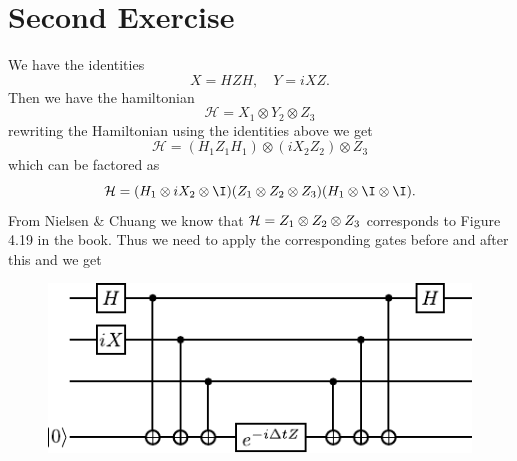 \section{Second Exercise}
We have the identities
\begin{equation}
    X = HZH, \quad Y = iXZ.
\end{equation}
Then we have the hamiltonian 
\begin{equation}
    \mathcal{H} = X_1 \otimes Y_2 \otimes Z_3
\end{equation}
rewriting the Hamiltonian using the identities above we get
\begin{equation}
    \mathcal{H} = (H_1 Z_1 H_1) \otimes (i X_2 Z_2) \otimes Z_3
\end{equation}
which can be factored as
\begin{equation}
    \mathcal{H} =  (H_1 \otimes iX_2 \otimes \I) ( Z_1 \ot Z_2 \ot Z_3) (H_1 \ot \I \ot \I).
\end{equation}
From Nielsen \& Chuang we know that $\mathcal{H} = Z_1 \otimes Z_2 \otimes Z_3$ corresponds to Figure 4.19 in the book. Thus we need to apply the corresponding gates before and after this and we get
\begin{figure}[H]
    \centering
    \includegraphics{figures/circuit_2.pdf}
\end{figure}